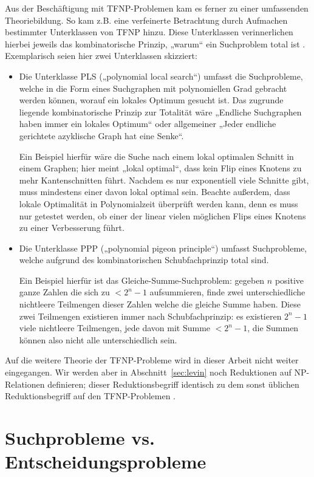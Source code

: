 Aus der Beschäftigung mit TFNP-Problemen kam es ferner zu einer umfassenden Theoriebildung. So kam z.B. eine verfeinerte Betrachtung durch Aufmachen bestimmter Unterklassen von TFNP hinzu. Diese Unterklassen verinnerlichen hierbei jeweils das kombinatorische Prinzip, „warum“ ein Suchproblem total ist \parencite[vgl. den Überblick von][]{goldberg_towards_2018}. Exemplarisch seien hier zwei Unterklassen skizziert:
\begin{itemize}
    \item Die Unterklasse PLS („polynomial local search“) umfasst die Suchprobleme, welche in die Form eines Suchgraphen mit polynomiellen Grad gebracht werden können, worauf ein lokales Optimum gesucht ist.
        Das zugrunde liegende kombinatorische Prinzip zur Totalität wäre „{Endliche Suchgraphen haben immer ein lokales Optimum}“ oder allgemeiner „{Jeder endliche gerichtete azyklische Graph hat eine Senke}“.

        Ein Beispiel hierfür wäre die Suche nach einem lokal optimalen Schnitt in einem Graphen; hier meint „lokal optimal“, dass kein Flip eines Knotens zu mehr Kantenschnitten führt. Nachdem es nur exponentiell viele Schnitte gibt, muss mindestens einer davon lokal optimal sein. Beachte außerdem, dass lokale Optimalität in Polynomialzeit überprüft werden kann, denn es muss nur getestet werden, ob einer der linear vielen möglichen Flips eines Knotens zu einer Verbesserung führt.

    \item Die Unterklasse PPP („polynomial pigeon principle“) umfasst Suchprobleme, welche aufgrund des kombinatorischen Schubfachprinzip total sind. 

        Ein Beispiel hierfür ist das Gleiche-Summe-Suchproblem: gegeben $n$ positive ganze Zahlen die sich zu $<2^n-1$ aufsummieren, finde zwei unterschiedliche nichtleere Teilmengen dieser Zahlen welche die gleiche Summe haben. Diese zwei Teilmengen existieren immer nach Schubfachprinzip: es existieren $2^n-1$ viele nichtleere Teilmengen, jede davon mit Summe $<2^n-1$, die Summen können also nicht alle unterschiedlich sein.
\end{itemize}
Auf die weitere Theorie der TFNP-Probleme wird in dieser Arbeit nicht weiter eingegangen. Wir werden aber in Abschnitt~\ref{sec:levin} noch Reduktionen auf NP-Relationen definieren; dieser Reduktionsbegriff identisch zu dem sonst üblichen Reduktionsbegriff auf den TFNP-Problemen \parencite{megiddo_total_1991}.


\section{Suchprobleme vs. Entscheidungsprobleme}\label{sec:search-vs-decision}

